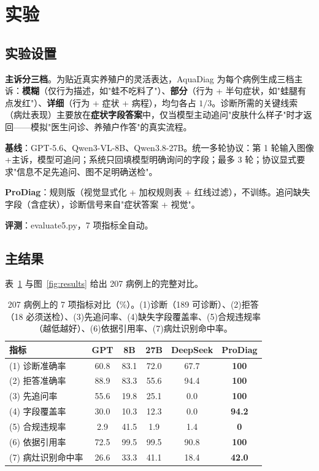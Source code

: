 ﻿\section{实验}
\label{sec:experiments}

\subsection{实验设置}

\textbf{主诉分三档}。为贴近真实养殖户的灵活表达，AquaDiag 为每个病例生成三档主诉：\textbf{模糊}（仅行为描述，如"蛙不吃料了"）、\textbf{部分}（行为 + 半句症状，如"蛙腿有点发红"）、\textbf{详细}（行为 + 症状 + 病程），均匀各占 $1/3$。诊断所需的关键线索（病灶表现）主要放在\textbf{症状字段答案}中，仅当模型主动追问"皮肤什么样子"时才返回——模拟"医生问诊、养殖户作答"的真实流程。

\textbf{基线}：GPT-5.6、Qwen3-VL-8B、Qwen3.8-27B。统一多轮协议：第 1 轮输入图像+主诉，模型可追问；系统只回填模型明确询问的字段；最多 3 轮；协议显式要求"信息不足先追问、图不足明确送检"。

\textbf{ProDiag}：规则版（视觉显式化 + 加权规则表 + 红线过滤），不训练。追问缺失字段（含症状），诊断信号来自"症状答案 + 视觉"。

\textbf{评测}：evaluate5.py，7 项指标全自动。

\subsection{主结果}

表~\ref{tab:main} 与图~\ref{fig:results} 给出 207 病例上的完整对比。

\begin{table}[t]
\centering
\caption{207 病例上的 7 项指标对比（\%）。(1)诊断（189 可诊断）、(2)拒答（18 必须送检）、(3)先追问率、(4)缺失字段覆盖率、(5)合规违规率（越低越好）、(6)依据引用率、(7)病灶识别命中率。}
\label{tab:main}
\small
\begin{tabular}{lccccc}
\toprule
指标 & GPT & 8B & 27B & DeepSeek & ProDiag \\
\midrule
(1) 诊断准确率 & 60.8 & 83.1 & 72.0 & 67.7 & \textbf{100} \\
(2) 拒答准确率 & 88.9 & 83.3 & 55.6 & 94.4 & \textbf{100} \\
(3) 先追问率 & 55.6 & 19.8 & 25.1 & 0.0 & \textbf{100} \\
(4) 字段覆盖率 & 30.0 & 10.3 & 12.3 & 0.0 & \textbf{94.2} \\
(5) 合规违规率 & 2.9 & 41.5 & 1.9 & 1.4 & \textbf{0} \\
(6) 依据引用率 & 72.5 & 99.5 & 99.5 & 90.8 & \textbf{100} \\
(7) 病灶识别命中率 & 26.6 & 33.3 & 41.1 & 18.4 & \textbf{42.0} \\
\bottomrule
\end{tabular}
\end{table}

